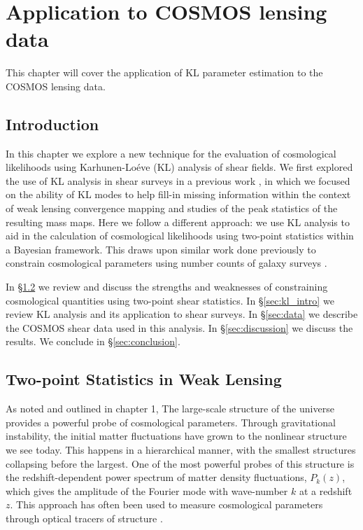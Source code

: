 \chapter{Application to COSMOS lensing data}

This chapter will cover the application of KL parameter estimation to the 
COSMOS lensing data.


\section{Introduction}
\label{sec:introduction}

In this chapter we explore a new technique for the evaluation of cosmological
likelihoods using Karhunen-Lo\'{e}ve (KL) analysis of shear fields.  
We first explored the use of KL analysis in shear surveys in a previous work
\citep[Chapter 4;][]{Vanderplas2012},
in which we focused on the ability of
KL modes to help fill-in missing information within the context of weak
lensing convergence mapping and studies of the peak statistics of the
resulting mass maps.
Here we follow a different approach:
we use KL analysis to aid in the calculation of cosmological likelihoods
using two-point statistics within a Bayesian framework.
This draws upon similar work done
previously to constrain cosmological parameters using number counts of
galaxy surveys \citep{Vogeley96, Pope04}.

In \S\ref{sec:lensing_intro} we review and discuss the strengths and
weaknesses of constraining cosmological quantities using two-point shear
statistics.
In \S\ref{sec:kl_intro} we review KL analysis and its application to 
shear surveys.
In \S\ref{sec:data} we describe the COSMOS shear data used in this analysis.
In \S\ref{sec:discussion} we discuss the results.
We conclude in \S\ref{sec:conclusion}.

\section{Two-point Statistics in Weak Lensing}
\label{sec:lensing_intro}
As noted and outlined in chapter 1,
The large-scale structure of the universe provides a powerful probe of
cosmological parameters.  Through gravitational instability, the initial
matter fluctuations have grown to the nonlinear structure we see today.
This happens in a hierarchical manner, with the smallest structures
collapsing before the largest.  One of the most powerful probes of this
structure is the redshift-dependent power spectrum of matter density
fluctuations, $P_k(z)$, which gives the amplitude of the
Fourier mode with wave-number $k$ at a redshift $z$. 
This approach has often been used to measure cosmological parameters
through optical tracers of structure \citep{Tegmark06}.


